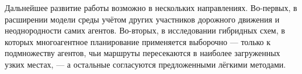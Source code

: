 Дальнейшее развитие работы возможно в нескольких направлениях. Во-первых, в расширении модели среды 
учётом других участников дорожного движения и неоднородности самих агентов. Во-вторых, в исследовании 
гибридных схем, в которых многоагентное планирование применяется выборочно --- только к подмножеству 
агентов, чьи маршруты пересекаются в наиболее загруженных узких местах, --- а остальные согласуются 
предложенными лёгкими методами.
